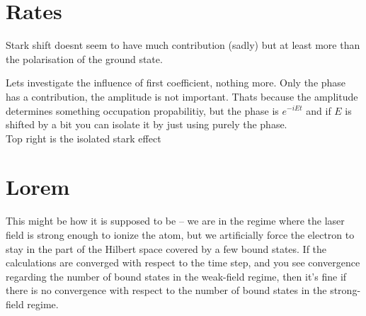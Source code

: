 \section{Rates}
Stark shift doesnt seem to have much contribution (sadly) but at least more than the polarisation of the ground state.

Lets investigate the influence of first coefficient, nothing more. Only the phase has a contribution, the amplitude is not important.
Thats because the amplitude determines something occupation propabilitiy, but the phase is $e^{-iEt}$ and if $E$ is shifted by a bit you can isolate it by just using purely the phase.\\
Top right is the isolated stark effect





\section{Lorem}
This might be how it is supposed to be -- we are in the regime where the laser field is strong enough to ionize the atom, 
but we artificially force the electron to stay in the part of the Hilbert space covered by a few bound states. 
If the calculations are converged with respect to the time step, and you see convergence regarding the number of bound states in the weak-field regime, 
then it's fine if there is no convergence with respect to the number of bound states in the strong-field regime.







